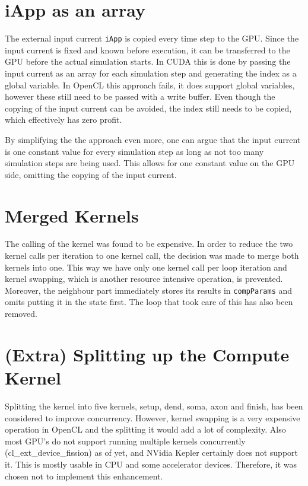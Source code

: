 \documentclass[final]{report}
\begin{document}
\section{iApp as an array}\label{sec:iapp-array}
The external input current \texttt{iApp} is copied every time step to the GPU.
Since the input current is fixed and known before execution, it can be transferred to the GPU before the actual simulation starts.
In CUDA this is done by passing the input current as an array for each simulation step and generating the index as a global variable.
In OpenCL this approach fails, it does support global variables, however these still need to be passed with a write buffer.
Even though the copying of the input current can be avoided, the index still needs to be copied, which effectively has zero profit.

By simplifying the the approach even more, one can argue that the input current is one constant value for every simulation step as long as not too many simulation steps are being used.
This allows for one constant value on the GPU side, omitting the copying of the input current.

\section{Merged Kernels}\label{sec:one-kernel}
The calling of the kernel was found to be expensive.
In order to reduce the two kernel calls per iteration to one kernel call, the decision was made to merge both kernels into one.
This way we have only one kernel call per loop iteration and kernel swapping, which is another resource intensive operation, is prevented.
Moreover, the neighbour part immediately stores its results in \texttt{compParams} and omits putting it in the state first.
The loop that took care of this has also been removed.

\section{(Extra) Splitting up the Compute Kernel}
Splitting the kernel into five kernels, setup, dend, soma, axon and finish, has been considered to improve concurrency.
However, kernel swapping is a very expensive operation in OpenCL and the splitting it would add a lot of complexity.
Also most GPU's do not support running multiple kernels concurrently (cl\_ext\_device\_fission) as of yet, and NVidia Kepler certainly does not support it.
This is mostly usable in CPU and some accelerator devices.
Therefore, it was chosen not to implement this enhancement.
\end{document}
